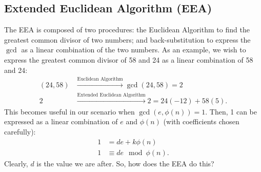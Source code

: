 \documentclass[]{scrartcl}
\theoremstyle{definition}
\begin{document}
\subsection{Extended Euclidean Algorithm (EEA)}
The EEA is composed of two procedures: the Euclidean Algorithm to find the greatest common divisor of two numbers; and back-substitution to express the $\gcd$ as a linear combination of the two numbers. As an example, we wish to express the greatest common divisor of 58 and 24 as a linear combination of 58 and 24:
\begin{align*}
    (24,58)&\xrightarrow{\text{Euclidean Algorithm}}\gcd(24, 58)=2 \\
    2&\xrightarrow{\text{Extended Euclidean Algorithm}}2 = 24(-12) + 58(5).
\end{align*}
This becomes useful in our scenario when $\gcd(e,\phi(n)) = 1$. Then, 1 can be expressed as a linear combination of $e$ and $\phi(n)$ (with coefficients chosen carefully):
\begin{align*}
    1 &= d e + k \phi(n) \\
    1 &\equiv d e \mod \phi(n).
\end{align*}
Clearly, $d$ is the value we are after. So, how does the EEA do this?
\end{document}
